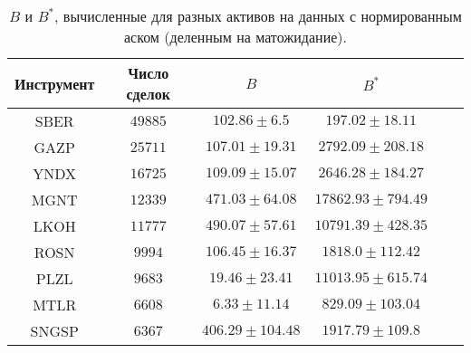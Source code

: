     \begin{table}[h!]
        \begin{center}
            \begin{tabular}{|c|c|c|c|c|c|}
                \hline
                Инструмент        & Число сделок & $B$ & $B ^*$ \\ \hline
                SBER & $49885$ & $102.86 \pm 6.5$ & $197.02 \pm 18.11$ \\ \hline 
                GAZP & $25711$ & $107.01 \pm 19.31$ & $2792.09 \pm 208.18$ \\ \hline 
                YNDX & $16725$ & $109.09 \pm 15.07$ & $2646.28 \pm 184.27$ \\ \hline 
                MGNT & $12339$ & $471.03 \pm 64.08$ & $17862.93 \pm 794.49$ \\ \hline 
                LKOH & $11777$ & $490.07 \pm 57.61$ & $10791.39 \pm 428.35$ \\ \hline 
                ROSN & $9994$ & $106.45 \pm 16.37$ & $1818.0 \pm 112.42$ \\ \hline 
                PLZL & $9683$ & $19.46 \pm 23.41$ & $11013.95 \pm 615.74$ \\ \hline 
                MTLR & $6608$ & $6.33 \pm 11.14$ & $829.09 \pm 103.04$ \\ \hline 
                SNGSP & $6367$ & $406.29 \pm 104.48$ & $1917.79 \pm 109.8$ \\ \hline 
    
            \end{tabular}
        \end{center}
        \caption{$B$ и $B ^*$, вычисленные для разных активов на данных с нормированным аском (деленным на матожидание).}
        \label{RD_SE_2}
        \end{table} 

    